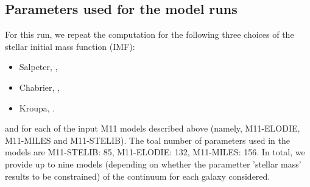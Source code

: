 \documentclass[onecolumn]{aa}
\begin{document}
% 
% 

% 

\subsection{Parameters used for the model runs}
\label{subsec:parameters}

For this run, we repeat the computation for the following three choices of the stellar initial mass function (IMF):
\begin{itemize}
\item Salpeter, \citet{Salpeter_1955},  
\item Chabrier, \citet{Chabrier2003}, 
\item Kroupa, \citet{Kroupa2001}. 
\end{itemize}
and for each of the input M11 models described above (namely, M11-ELODIE, M11-MILES and M11-STELIB).
The toal number of parameters used in the models are M11-STELIB: 85, M11-ELODIE: 132, M11-MILES: 156. 
In total, we provide up to nine models (depending on whether 
the parametter 'stellar mass' results to be constrained) of the continuum for each galaxy considered. 
\end{document}
